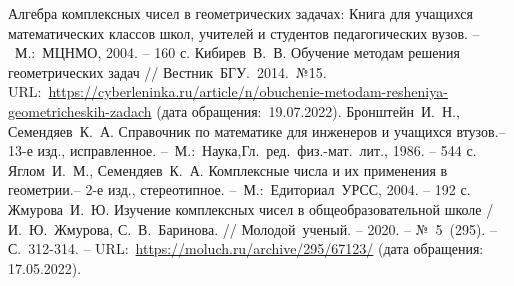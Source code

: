 \renewcommand\bibname{Список литературы}
\begin{thebibliography}{00}
    Алгебра комплексных чисел в геометрических задачах:
   Книга для учащихся математических классов школ, учителей и студентов педагогических вузов. --~М.:~МЦНМО,
   2004. -- 160 с.
    Кибирев~В.~В. Обучение методам решения геометрических задач // Вестник~БГУ.~2014.~№15. URL:~\href{https://cyberleninka.ru/article/n/obuchenie-metodam-resheniya-geometricheskih-zadach}{https://cyberleninka.ru/article/n/obuchenie-metodam-resheniya-geometricheskih-zadach} (дата обращения:~19.07.2022).
    Бронштейн~И.~Н., Семендяев~К.~А. Справочник по математике для инженеров и учащихся втузов.-- 13-е изд., исправленное. --~М.:~Наука,Гл.~ред.~физ.-мат.~лит., 1986. -- 544 с.
    Яглом~И.~М., Семендяев~К.~А. Комплексные числа и их применения в геометрии.-- 2-е изд., стереотипное. --~М.:~Едиториал~УРСС, 2004. -- 192 с.
    Жмурова~И.~Ю. Изучение комплексных чисел в общеобразовательной школе / И.~Ю.~Жмурова, С.~В.~Баринова. // Молодой~ученый. -- 2020. -- №~5~(295). -- С.~312-314. -- URL:~\href{https://moluch.ru/archive/295/67123/}{https://moluch.ru/archive/295/67123/} (дата обращения: 17.05.2022).
\end{thebibliography}
